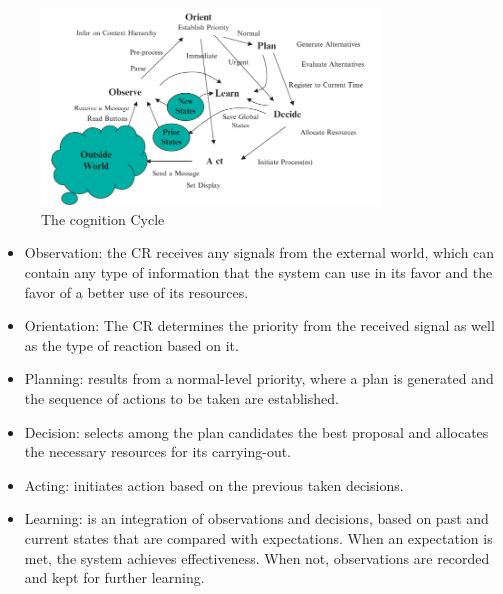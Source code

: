 \begin{figure}[htb]
    \centering
      \includegraphics[width=0.8\textwidth]{figures/cognition_cycle.png}
      \caption{The cognition Cycle\cite{Mitola1999}}
      \label{fig:cognition_cycle}
\end{figure}

\begin{itemize}
    \item Observation: the \ac{CR} receives any signals from the external world, which can contain any type of information that the system can use in its favor and the favor of a better use of its resources.
    \item Orientation: The \ac{CR} determines the priority from the received signal as well as the type of reaction based on it.
    \item Planning: results from a normal-level priority, where a plan is generated and the sequence of actions to be taken are established.
    \item Decision: selects among the plan candidates the best proposal and allocates the necessary resources for its carrying-out.
    \item Acting: initiates action based on the previous taken decisions.
    \item Learning: is an integration of observations and decisions, based on past and current states that are compared with expectations. When an expectation is met, the system achieves effectiveness. When not, observations are recorded and kept for further learning.
\end{itemize}

